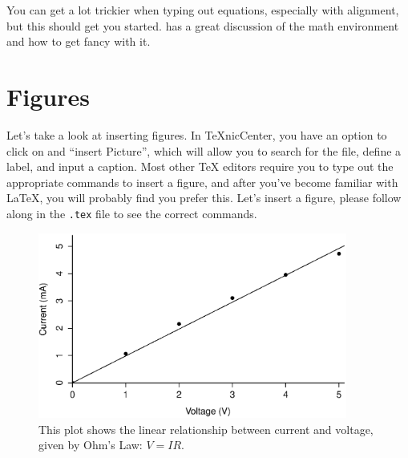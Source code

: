 \documentclass[11pt,letterpaper]{article} %
\begin{document}
You can get a lot trickier when typing out equations, especially with alignment, but this should get you started. \cite{LatexIntro} has a great discussion of the math environment and how to get fancy with it.  %

\section{Figures}

Let's take a look at inserting figures. In \TeX nicCenter, you have an option to click on and ``insert Picture'', which will allow you to search for the file, define a label, and input a caption. Most other \TeX{} editors require you to type out the appropriate commands to insert a figure, and after you've become familiar with \LaTeX, you will probably find you prefer this. Let's insert a figure, please follow along in the \texttt{.tex} file to see the correct commands.

\begin{figure}[htp] %

\centering %
\includegraphics[width = 4in]{dummylabplot.eps} %
\caption{This plot shows the linear relationship between current and voltage, given by Ohm's Law: $V = IR$.}
\label{fig:VIcurve}
\end{figure}
\end{document}
